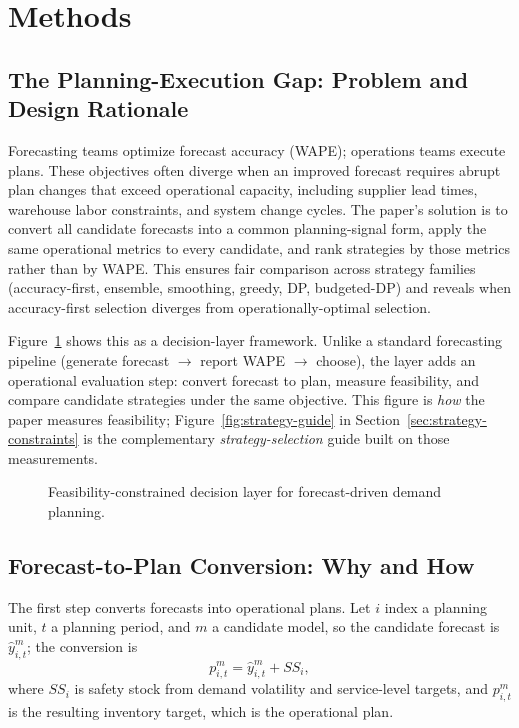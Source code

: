 \section{Methods}
\label{sec:methods}

\subsection{The Planning-Execution Gap: Problem and Design Rationale}

Forecasting teams optimize forecast accuracy (WAPE); operations teams execute plans. These objectives often diverge when an improved forecast requires abrupt plan changes that exceed operational capacity, including supplier lead times, warehouse labor constraints, and system change cycles. The paper's solution is to convert all candidate forecasts into a common planning-signal form, apply the same operational metrics to every candidate, and rank strategies by those metrics rather than by WAPE. This ensures fair comparison across strategy families (accuracy-first, ensemble, smoothing, greedy, DP, budgeted-DP) and reveals when accuracy-first selection diverges from operationally-optimal selection.

Figure~\ref{fig:framework} shows this as a decision-layer framework. Unlike a standard forecasting pipeline (generate forecast $\to$ report WAPE $\to$ choose), the layer adds an operational evaluation step: convert forecast to plan, measure feasibility, and compare candidate strategies under the same objective. This figure is \emph{how} the paper measures feasibility; Figure~\ref{fig:strategy-guide} in Section~\ref{sec:strategy-constraints} is the complementary \emph{strategy-selection} guide built on those measurements.

\begin{figure}[H]
\centering
\resizebox{\linewidth}{!}{}
\caption{Feasibility-constrained decision layer for forecast-driven demand planning.}
\label{fig:framework}
\end{figure}

\subsection{Forecast-to-Plan Conversion: Why and How}

The first step converts forecasts into operational plans. Let $i$ index a planning unit, $t$ a planning period, and $m$ a candidate model, so the candidate forecast is $\hat{y}_{i,t}^{m}$; the conversion is
\begin{equation}
p_{i,t}^{m} = \hat{y}_{i,t}^{m} + SS_i,
\end{equation}
where $SS_i$ is safety stock from demand volatility and service-level targets, and $p_{i,t}^{m}$ is the resulting inventory target, which is the operational plan.

